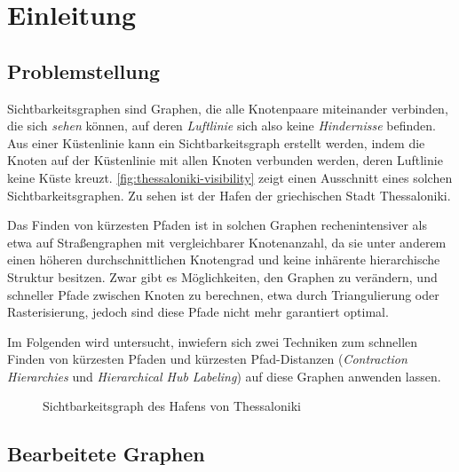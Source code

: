 \chapter{Einleitung}

\section{Problemstellung}
Sichtbarkeitsgraphen sind Graphen, die alle Knotenpaare miteinander verbinden, die sich \emph{sehen} können, auf deren \emph{Luftlinie} sich also keine \emph{Hindernisse} befinden.
Aus einer Küstenlinie kann ein Sichtbarkeitsgraph erstellt werden, indem die Knoten auf der Küstenlinie mit allen Knoten verbunden werden, deren Luftlinie keine Küste kreuzt.
\autoref{fig:thessaloniki-visibility} zeigt einen Ausschnitt eines solchen Sichtbarkeitsgraphen.
Zu sehen ist der Hafen der griechischen Stadt Thessaloniki.

Das Finden von kürzesten Pfaden ist in solchen Graphen rechenintensiver als etwa auf Straßengraphen mit vergleichbarer Knotenanzahl, da sie unter anderem einen höheren durchschnittlichen Knotengrad und keine inhärente hierarchische Struktur besitzen.
Zwar gibt es Möglichkeiten, den Graphen zu verändern, und schneller Pfade zwischen Knoten zu berechnen, etwa durch Triangulierung oder Rasterisierung, jedoch sind diese Pfade nicht mehr garantiert optimal.

Im Folgenden wird untersucht, inwiefern sich zwei Techniken zum schnellen Finden von kürzesten Pfaden und kürzesten Pfad-Distanzen (\emph{Contraction Hierarchies} und \emph{Hierarchical Hub Labeling}) auf diese Graphen anwenden lassen.

\begin{figure}[ht]%
  \centering
  \caption{Sichtbarkeitsgraph des Hafens von Thessaloniki}%
  \label{fig:thessaloniki-visibility}%
\end{figure}

\section{Bearbeitete Graphen}

